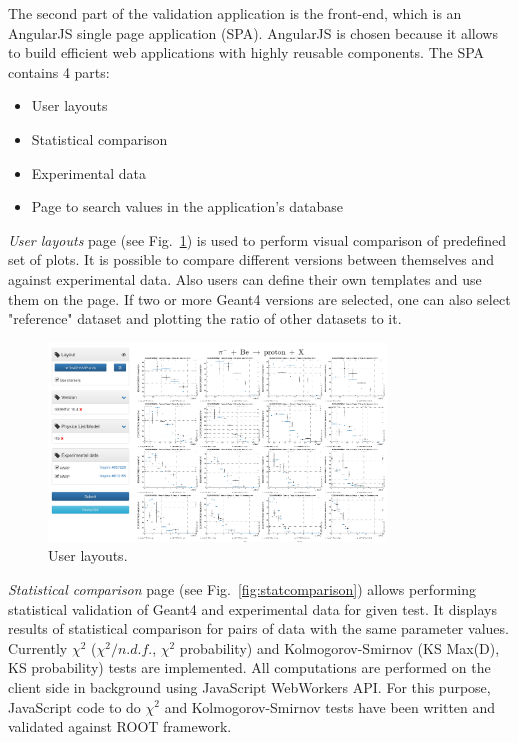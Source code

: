 The second part of the validation application is the front-end, which is an AngularJS single page application (SPA).
AngularJS is chosen because it allows to build efficient web applications with highly reusable components.
The SPA contains 4 parts:

\begin{itemize}
    \item User layouts
    \item Statistical comparison
    \item Experimental data
    \item Page to search values in the application's database
\end{itemize}

\textit{User layouts} page (see Fig.~\ref{fig:layouts}) is used to perform visual comparison of predefined set of plots. It is possible to compare different versions between themselves and against experimental data. Also users can define their own templates and use them on the page. 
If two or more Geant4 versions are selected, one can also select "reference" dataset and plotting the ratio of other datasets to it.

\begin{figure}[h]
    \centering
    \includegraphics[width=0.8\textwidth,clip]{layouts.png}
    \caption{User layouts.}
    \label{fig:layouts}
\end{figure}

\textit{Statistical comparison} page (see Fig.~\ref{fig:statcomparison}) allows performing statistical validation of Geant4 and experimental data for given test. It displays results of statistical comparison for pairs of data with the same parameter values.
Currently $\chi^2$ ($\chi^2/n.d.f.$, $\chi^2$ probability) and Kolmogorov-Smirnov (KS Max(D), KS probability) tests are implemented. All computations are performed on the client side in background using JavaScript WebWorkers API.
For this purpose, JavaScript code to do $\chi^2$ and Kolmogorov-Smirnov tests have been written and validated against ROOT framework.

